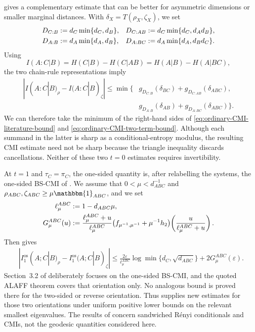 \documentclass[11pt]{article}
\theoremstyle{remark}
\DeclareMathOperator{\os}{os}
\newcommand{\1}{\mathbbm{1}}
\begin{document}
 gives a complementary estimate
that can be better for asymmetric dimensions or smaller marginal
distances.  With $\delta_X=T(\rho_X,\zeta_X)$, we set
\begin{align}
 D_{C:B}&:=d_C\min\{d_C,d_B\},
 &D_{C:AB}&:=d_C\min\{d_C,d_Ad_B\},\notag\\
 D_{A:B}&:=d_A\min\{d_A,d_B\},
 &D_{A:BC}&:=d_A\min\{d_A,d_Bd_C\}.
 \label{eq:CMI-effective-dimensions}
\end{align}
Using
\begin{equation}
 I(A:C|B)=H(C|B)-H(C|AB)=H(A|B)-H(A|BC),
\end{equation}
the two chain-rule representations imply
\begin{equation}
 \begin{aligned}
 |I(A:C|B)_\rho-I(A:C|B)_\zeta|
 \leq\min\bigl\{&
 g_{D_{C:B}}(\delta_{BC})
 +g_{D_{C:AB}}(\delta_{ABC}),\\
 &g_{D_{A:B}}(\delta_{AB})
 +g_{D_{A:BC}}(\delta_{ABC})\bigr\}.
 \end{aligned}
 \label{eq:ordinary-CMI-two-term-bound}
\end{equation}
We can therefore take the minimum of the right-hand sides of
\eqref{eq:ordinary-CMI-literature-bound} and
\eqref{eq:ordinary-CMI-two-term-bound}.  Although each summand in
the latter is sharp as a conditional-entropy modulus, the resulting
CMI estimate need not be sharp because the triangle inequality
discards cancellations.
Neither of these two $t=0$ estimates requires invertibility.

At $t=1$ and $\tau_C=\pi_C$, the one-sided quantity is, after
relabelling the systems, the one-sided BS-CMI of
\cite[Eq.~(4)]{bluhm2023continuity}.  We assume that
$0<\mu<d_{ABC}^{-1}$ and
$\rho_{ABC},\zeta_{ABC}\geq\mu\1_{ABC}$, and we set
\begin{align}
 \ell_\mu^{ABC}&:=1-d_{ABC}\mu,\notag\\
 G_\mu^{ABC}(u)
 &:=\frac{\ell_\mu^{ABC}+u}{\ell_\mu^{ABC}}
 \bigl(f_{\mu^{-1},\mu^{-1}}+\mu^{-1}h_2\bigr)
 \!\left(\frac{u}{\ell_\mu^{ABC}+u}\right).
 \label{eq:BS-CMI-literature-modulus}
\end{align}
Then \cite[Corollary~6.11]{bluhm2023continuity} gives
\begin{equation}
 \begin{aligned}
 &|I_1^{\os}(A;C|B)_\rho-I_1^{\os}(A;C|B)_\zeta|\leq
 \frac{2\varepsilon}{\ell_\mu^{ABC}}
 \log\min\{d_C,\sqrt{d_{ABC}}\}
 +2G_\mu^{ABC}(\varepsilon).
 \end{aligned}
 \label{eq:BS-CMI-literature-bound}
\end{equation}
Section~3.2 of \cite{bluhm2023continuity} deliberately focuses on
the one-sided BS-CMI, and the quoted ALAFF theorem covers that
orientation only.  No analogous
bound is proved there for the two-sided or reverse orientation.
Thus  supplies new
estimates for those two orientations under uniform positive lower
bounds on the relevant smallest eigenvalues.  The results of
\cite[Sections~5.1 and~5.3]{bluhm2026unified} concern sandwiched
R\'enyi conditionals and
CMIs, not the geodesic quantities considered here.
\end{document}
